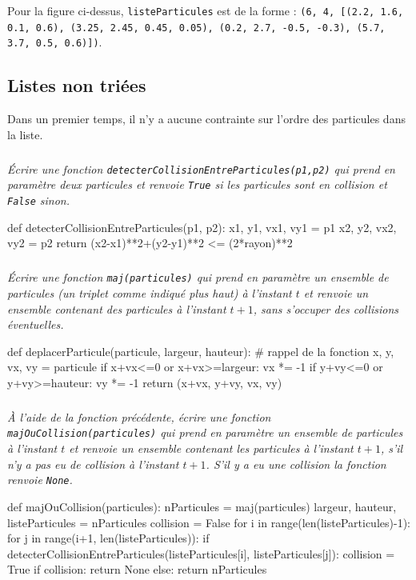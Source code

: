 \documentclass[10pt,fleqn]{article} %
\begin{document}
\begin{exemple} Pour la figure ci-dessus, \texttt{listeParticules} est de la forme :
\texttt{(6, 4, [(2.2, 1.6, 0.1, 0.6), (3.25, 2.45, 0.45, 0.05), (0.2, 2.7, -0.5, -0.3),
(5.7, 3.7, 0.5, 0.6)])}.
\end{exemple}

\subsection*{Listes non triées}

Dans un premier temps, il n'y a aucune contrainte sur l'ordre des particules dans la liste. 
\subparagraph{}
\textit{Écrire une fonction \texttt{detecterCollisionEntreParticules(p1,p2)} qui prend en paramètre deux particules et renvoie \texttt{True} si les particules sont en collision et \texttt{False} sinon.}
\ifprof
\begin{corrige}
\begin{python}
def detecterCollisionEntreParticules(p1, p2): 
    x1, y1, vx1, vy1 = p1
    x2, y2, vx2, vy2 = p2
    return (x2-x1)**2+(y2-y1)**2 <= (2*rayon)**2
\end{python}
\end{corrige}
\else
\fi


\subparagraph{}
\textit{Écrire une fonction \texttt{maj(particules)} qui prend en paramètre un ensemble de particules (un triplet comme indiqué plus haut) à l'instant $t$ et renvoie un ensemble contenant des particules à l'instant $t+1$, sans s'occuper des collisions éventuelles.}
\ifprof
\begin{corrige}
\begin{python}
def deplacerParticule(particule, largeur, hauteur): # rappel de la fonction
    x, y, vx, vy = particule
    if x+vx<=0 or x+vx>=largeur: vx *= -1
    if y+vy<=0 or y+vy>=hauteur: vy *= -1
    return (x+vx, y+vy, vx, vy)
\end{python}
\end{corrige}
\else
\fi

\subparagraph{}
\textit{À l'aide de la fonction précédente, écrire une fonction \texttt{majOuCollision(particules)} qui prend en paramètre un ensemble de particules à l'instant $t$ et renvoie un ensemble contenant les particules à l'instant $t+1$, s'il n'y a pas eu de collision à l'instant $t+1$. S'il y a eu une collision la fonction renvoie \texttt{None}.}
\ifprof
\begin{corrige}
\begin{python}
def majOuCollision(particules):
    nParticules = maj(particules)
    largeur, hauteur, listeParticules = nParticules
    collision = False    
    for i in range(len(listeParticules)-1):
        for j in range(i+1, len(listeParticules)):
            if detecterCollisionEntreParticules(listeParticules[i], listeParticules[j]):
                collision = True
    if collision:
        return None
    else:
        return nParticules 
\end{python}
\end{corrige}
\else
\fi
\end{document}
